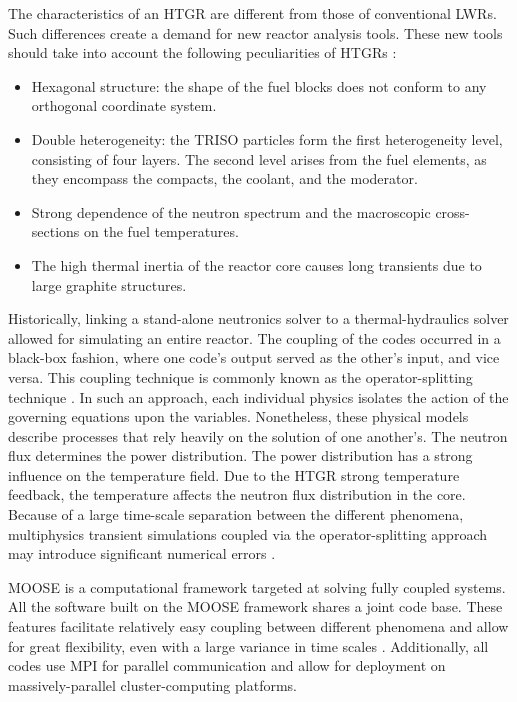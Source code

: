 The characteristics of an \gls{HTGR} are different from those of conventional \glspl{LWR}.
Such differences create a demand for new reactor analysis tools.
These new tools should take into account the following peculiarities of \glspl{HTGR} \cite{rohde_development_2012}\cite{bostelmann_criticality_2016}:
\begin{itemize}
\item Hexagonal structure: the shape of the fuel blocks does not conform to any orthogonal coordinate system.
\item Double heterogeneity: the TRISO particles form the first heterogeneity level, consisting of four
layers.
The second level arises from the fuel elements, as they encompass the compacts, the coolant, and the moderator.
\item Strong dependence of the neutron spectrum and the macroscopic cross-sections on the fuel temperatures.
\item The high thermal inertia of the reactor core causes long transients due to large graphite structures.
\end{itemize}

Historically, linking a stand-alone neutronics solver to a thermal-hydraulics solver allowed for simulating an entire reactor.
The coupling of the codes occurred in a black-box fashion, where one code's output served as the other's input, and vice versa.
This coupling technique is commonly known as the operator-splitting technique \cite{ragusa_consistent_2009}.
In such an approach, each individual physics isolates the action of the governing equations upon the variables.
Nonetheless, these physical models describe processes that rely heavily on the solution of one another's.
The neutron flux determines the power distribution.
The power distribution has a strong influence on the temperature field.
Due to the \gls{HTGR} strong temperature feedback, the temperature affects the neutron flux distribution in the core.
Because of a large time-scale separation between the different phenomena, multiphysics transient simulations coupled via the operator-splitting approach may introduce significant numerical errors \cite{ragusa_consistent_2009} \cite{park_tightly_2010}.

\gls{MOOSE} \cite{gaston_moose_2009} is a computational framework targeted at solving fully coupled systems.
All the software built on the \gls{MOOSE} framework shares a joint code base.
These features facilitate relatively easy coupling between different phenomena and allow for great flexibility, even with a large variance in time scales \cite{novak_pronghorn_2018}.
Additionally, all codes use MPI for parallel communication and allow for deployment on massively-parallel cluster-computing platforms.

